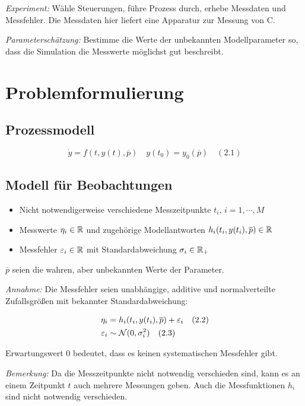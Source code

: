\emph{Experiment:} Wähle Steuerungen, führe Prozess durch, erhebe Messdaten und Messfehler. Die Messdaten hier liefert eine Apparatur zur Messung von C.


\emph{Parameterschätzung:} Bestimme die Werte der unbekannten Modellparameter so, dass die Simulation die Messwerte möglichst gut beschreibt.

\section*{Problemformulierung}

\subsection*{Prozessmodell}

\[\dot y = f(t,y(t),\overline p) \quad y(t_0) = y_0(\overline p) \quad (2.1)\]

\subsection*{Modell für Beobachtungen}

\begin{itemize}
\item Nicht notwendigerweise verschiedene Messzeitpunkte $t_i$, $i=1,\cdots,M$
\item Messwerte $\eta_i \in \mathbb{R}$ und zugehörige Modellantworten $h_i (t_i, y(t_i), \overline p) \in \mathbb{R}$
\item Messfehler $\varepsilon_i \in \mathbb{R}$ mit Standardabweichung $\sigma_i \in \mathbb{R}_+$
\end{itemize}

$\overline p$ seien die wahren, aber unbekannten Werte der Parameter.

\emph{Annahme:} Die Messfehler seien unabhängige, additive und normalverteilte Zufallsgrößen mit bekannter Standardabweichung:

\begin{align*}
\eta_i &= h_i(t_i, y(t_i), \overline p) + \varepsilon_i \quad (2.2) \\
\varepsilon_i &\sim \mathcal N(0, \sigma_i^2) \quad (2.3)
\end{align*}

Erwartungswert $0$ bedeutet, dass es keinen systematischen Messfehler gibt.

\emph{Bemerkung:} Da die Messzeitpunkte nicht notwendig verschieden sind, kann es an einem Zeitpunkt $t$ auch mehrere Messungen geben. Auch die Messfunktionen $h_i$ sind nicht notwendig verschieden.

